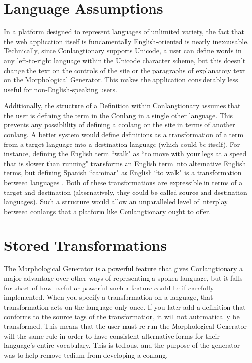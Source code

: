 \section{Language Assumptions}
\label{sec:refactor-language-assumption}

In a platform designed to represent languages of unlimited variety, the fact that the web application itself is fundamentally English-oriented is nearly inexcusable. Technically, since Conlangtionary supports Unicode, a user can define words in any left-to-right language within the Unicode character scheme, but this doesn't change the text on the controls of the site or the paragraphs of explanatory text on the Morphological Generator. This makes the application considerably less useful for non-English-speaking users.

Additionally, the structure of a Definition within Conlangtionary assumes that the user is defining the term in the Conlang in a single other language. This prevents any possiblility of defining a conlang on the site in terms of another conlang. A better system would define definitions as a transformation of a term from a target language into a destination language (which could be itself). For instance, defining the English term ``walk" as ``to move with your legs at a speed that is slower than running" transforms an English term into alternative English terms, but defining Spanish ``caminar" as English ``to walk" is a transformation between languages \cite{Merriam-Webster:walk}. Both of these transformations are expressible in terms of a target and destination (alternatively, they could be called source and destination languages). Such a structure would allow an unparalleled level of interplay between conlangs that a platform like Conlangtionary ought to offer.

\section{Stored Transformations}
\label{sec:refactor-stored-transformations}

The Morphological Generator is a powerful feature that gives Conlangtionary a major advantage over other ways of representing a spoken language, but it falls far short of how useful or powerful such a feature could be if carefully implemented. When you specify a transformation on a language, that transformation acts on the language only once. If you later add a definition that conforms to the source tags of the transformation, it will not automatically be transformed. This means that the user must re-run the Morphological Generator will the same rule in order to have consistent alternative forms for their language's entire vocabulary. This is tedious, and the purpose of the generator was to help remove tedium from developing a conlang.

